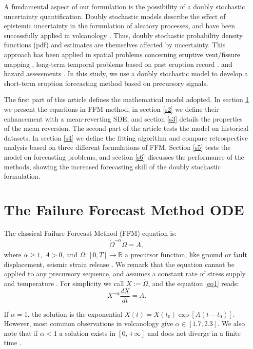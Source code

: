 \documentclass{article}
\begin{document}
A fundamental aspect of our formulation is the possibility of a doubly stochastic uncertainty quantification. Doubly stochastic models describe the effect of epistemic uncertainty in the formulation of aleatory processes, and have been successfully applied in volcanology \citep{Sparks2004, Marzocchi2012, Bevilacqua2016}. Thus, doubly stochastic probability density functions (pdf) and estimates are themselves affected by uncertainty. This approach has been applied in spatial problems concerning eruptive vent/fissure mapping \citep{Selva2012, Bevilacqua2015, Tadini2017a, Tadini2017b, Bevilacqua2017a}, long-term temporal problems based on past eruption record \citep{Bebbington2013, Bevilacqua2016b, Richardson2017, Bevilacqua2018}, and hazard assessments \citep{Neri2015, Bevilacqua2017b}. In this study, we use a doubly stochastic model to develop a short-term eruption forecasting method based on precursory signals.

The first part of this article defines the mathematical model adopted. In section \ref{s1} we present the equations in FFM method, in section \ref{s2} we define their enhancement with a mean-reverting SDE, and section \ref{s3} details the properties of the mean reversion. The second part of the article tests the model on historical datasets. In section \ref{s4} we define the fitting algorithm and compare retrospective analysis based on three different formulations of FFM. Section \ref{s5} tests the model on forecasting problems, and section \ref{s6} discusses the performance of the methods, showing the increased forecasting skill of the doubly stochastic formulation.

\section{The Failure Forecast Method ODE}\label{s1}
The classical Failure Forecast Method (FFM) equation is:
\begin{align}\label{eq1}
\dot\Omega^{-\alpha}\ddot{\Omega}=A,
\end{align}
where $\alpha\ge 1$, $A>0$, and $\Omega:[0,T]\rightarrow \mathbb R$ a precursor function, like ground or fault displacement, seismic strain release \citep{Voight1988}. We remark that the equation cannot be applied to any precursory sequence, and assumes a constant rate of stress supply and temperature \citep{Kilburn2018}. For simplicity we call $X:=\dot\Omega$, and the equation \ref{eq1} reads:
$$X^{-\alpha}\frac{dX}{dt}=A.$$

If $\alpha=1$, the solution is the exponential $X(t)=X(t_0)\exp[A(t-t_0)]$. However, most common observations in volcanology give $\alpha\in[1.7,2.3]$. We also note that if $\alpha<1$ a solution exists in $[0,+\infty]$ and does not diverge in a finite time \citep{Cornelius1995}.
\end{document}
